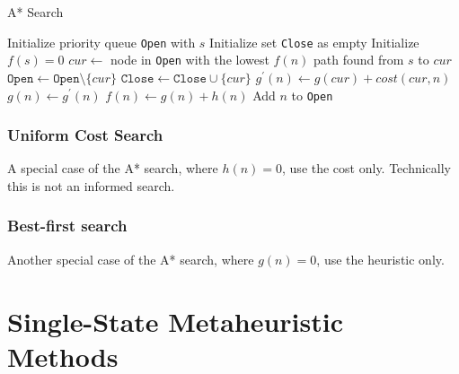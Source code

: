                 \begin{algorithm}
                    \centering
                    \caption{A* Search}
                    \begin{algorithmic}[1]
                    \State Initialize priority queue \texttt{Open} with $s$
                    \State Initialize set \texttt{Close} as empty
                    \State Initialize $f(s) = 0$
                        \State $cur \gets$ node in \texttt{Open} with the lowest $f(n)$
                            \State \Return path found from $s$ to $cur$
                        \EndIf
                        \State $\texttt{Open} \gets \texttt{Open}\setminus \{cur\}$
                        \State $\texttt{Close} \gets \texttt{Close} \cup \{cur\}$
                                \State $g^\prime(n) \gets g(cur) + cost(cur, n)$
                                    \State $g(n) \gets g^\prime(n)$
                                    \State $f(n) \gets g(n) + h(n)$
                                        \State Add $n$ to \texttt{Open}
                                    \EndIf
                                \EndIf
                            \EndIf
                        \EndFor
                    \EndWhile
                    \end{algorithmic}
                \end{algorithm}

            \subsubsection{Uniform Cost Search}
                A special case of the A* search, where $h(n) = 0$, use the cost only. Technically this is not an informed search.

            \subsubsection{Best-first search}
                Another special case of the A* search, where $g(n) = 0$, use the heuristic only.

    \section{Single-State Metaheuristic Methods}
